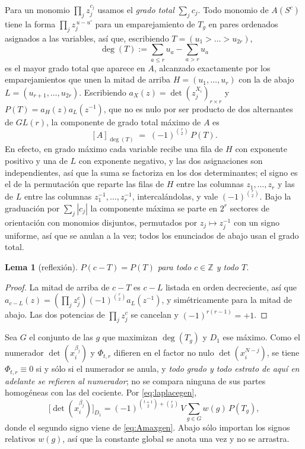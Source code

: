 \documentclass[11pt,reqno]{amsart}
\theoremstyle{plain}
\newtheorem{lemma}[theorem]{Lema}
\theoremstyle{definition}
\newcommand{\ZZ}{\mathbb{Z}}
\begin{document}
Para un monomio $\prod_j z_j^{c_j}$ usamos el \emph{grado total} $\sum_j c_j$. Todo monomio de
$A(S^{c})$ tiene la forma $\prod_j z_j^{\,u-u'}$ para un emparejamiento de $T_g$ en pares ordenados
asignados a las variables, así que, escribiendo $T=(u_1>\dots>u_{2r})$,
\begin{equation}\label{eq:deggen}
  \deg(T):=\sum_{a\le r}u_a-\sum_{a>r}u_a
\end{equation}
es el mayor grado total que aparece en $A$, alcanzado exactamente por los emparejamientos que unen la
mitad de arriba $H=(u_1,\dots,u_r)$ con la de abajo $L=(u_{r+1},\dots,u_{2r})$. Escribiendo
$a_X(z)=\det(z_j^{X_i})_{r\times r}$ y $P(T)=a_H(z)a_L(z^{-1})$, que no es nulo por ser producto de
dos alternantes de $GL(r)$, la componente de grado total máximo de $A$ es
\begin{equation}\label{eq:Amaxgen}
  [A]_{\deg(T)}\;=\;(-1)^{\binom r2}\,P(T).
\end{equation}
En efecto, en grado máximo cada variable recibe una fila de $H$ con exponente positivo y una de $L$
con exponente negativo, y las dos asignaciones son independientes, así que la suma se factoriza en
los dos determinantes; el signo es el de la permutación que reparte las filas de $H$ entre las
columnas $z_1,\dots,z_r$ y las de $L$ entre las columnas $z_1^{-1},\dots,z_r^{-1}$, intercalándolas,
y vale $(-1)^{\binom r2}$.
Bajo la graduación por $\sum_j|c_j|$ la componente máxima se parte en $2^r$ sectores de orientación
con monomios disjuntos, permutados por $z_j\mapsto z_j^{-1}$ con un signo uniforme, así que se anulan
a la vez; todos los enunciados de abajo usan el grado total.

\begin{lemma}[reflexión]\label{lem:reflgen}
$P(c-T)=P(T)$ para todo $c\in\ZZ$ y todo $T$.
\end{lemma}

\begin{proof}
La mitad de arriba de $c-T$ es $c-L$ listada en orden decreciente, así que
$a_{c-L}(z)=(\prod_j z_j^{c})(-1)^{\binom r2}a_L(z^{-1})$, y simétricamente para la mitad de abajo.
Las dos potencias de $\prod_j z_j^{c}$ se cancelan y $(-1)^{r(r-1)}=+1$.
\end{proof}

Sea $G$ el conjunto de las $g$ que maximizan $\deg(T_g)$ y $D_1$ ese máximo. Como el numerador
$\det(x_i^{\beta_j})$ y $\Phi_{t,r}$ difieren en el factor no nulo $\det(x_i^{N-j})$, se tiene
$\Phi_{t,r}\equiv0$ si y sólo si el numerador se anula, y \emph{todo grado y todo estrato de aquí en
adelante se refieren al numerador}; no se compara ninguna de sus partes homogéneas con las del
cociente. Por \eqref{eq:laplacegen},
\begin{equation}\label{eq:topgen}
  \bigl[\det(x_i^{\beta_j})\bigr]_{D_1}
  =(-1)^{\binom{t+1}{2}+\binom r2}\,V\sum_{g\in G}w(g)\,P(T_g),
\end{equation}
donde el segundo signo viene de \eqref{eq:Amaxgen}. Abajo sólo importan los signos relativos $w(g)$,
así que la constante global se anota una vez y no se arrastra.
\end{document}
